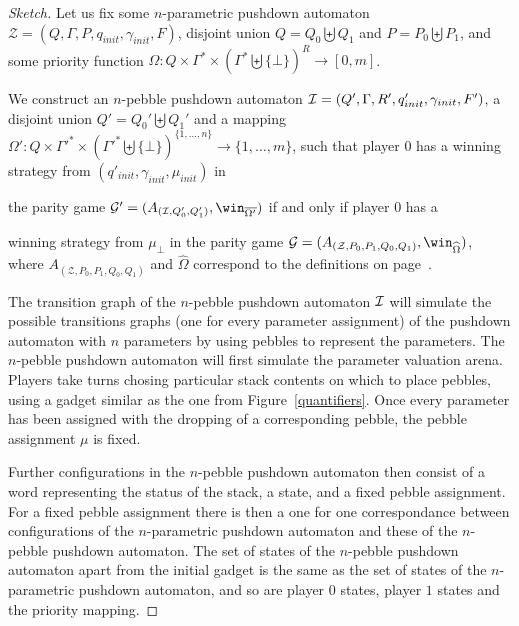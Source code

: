 \begin{proof}[Sketch]


Let us fix some
$n$-parametric pushdown automaton $\mathcal{Z}= (Q, \Gamma, 
P%
, q_{init}, { \gamma_{init}} , F)$,
 disjoint
union $Q = Q_0  \biguplus Q_1$
and $P = P_0 \biguplus P_1$,
and
some priority function 
$\Omega : Q \times \Gamma^* \times ( \Gamma^* \biguplus \{ \bot \})^R \to [0, m ]$.


We construct
  an 
 $n$-pebble pushdown automaton $\mathcal{I} =(Q', \Gamma,  R', q_{init}', {\gamma_{init}} , F')$,
a 
 disjoint
union $Q' = Q_0'  \biguplus Q_1'$
and a mapping $\Omega' : Q \times  \Gamma'^* \times ( \Gamma'^* \biguplus \{ \bot \})^{\{1, \ldots, n\}} \to \{1, \ldots, m \}$,
such that
%
player $0$ has a winning strategy from 
$(q'_{init},\gamma_{init}, \mu_{init})$
in

the parity game
$\mathcal{G'}= (A_{(\ppda, Q'_0, Q'_1)}, \win_{\overline{\Omega'}})$
if and only if
player $0$ has a 

winning strategy from $\mu_\bot$ in 
the parity game
$\mathcal{G} =(A_{(\mathcal{Z}, P_0, P_1, Q_0 , Q_1)}, \win_{\widehat{\Omega}})$,
where		 
$A_{(\mathcal{Z}, P_0, P_1, Q_0 , Q_1)}$
and
$\widehat{\Omega}$
correspond to the definitions on page~\pageref{PPDA reachability game}.

%
%
%
%


The transition graph of the $n$-pebble pushdown automaton $\mathcal{I}$ will simulate the possible transitions graphs 
(one for every 
parameter assignment)
 of the pushdown automaton with $n$ parameters by using pebbles to represent the parameters. 
The $n$-pebble pushdown automaton will first simulate the 
parameter valuation arena.
Players take turns chosing particular stack contents on which to place pebbles,
using a gadget similar as the one from Figure~\ref{quantifiers}. 
Once every parameter has been assigned with the dropping of a corresponding pebble, 
the pebble assignment $\mu$ is fixed.
%
%
%
%
%
%


Further configurations in the $n$-pebble pushdown automaton then consist of a word representing the status of the stack, a state, and a fixed pebble assignment. For a fixed pebble assignment there is then a one for one correspondance between configurations of the $n$-parametric pushdown 
automaton 
and these of the $n$-pebble pushdown automaton. The set of states of the $n$-pebble pushdown automaton apart from the initial gadget is the same as 
the set of states of the $n$-parametric pushdown automaton, and 
so are player $0$ states, player $1$ states and the priority mapping.
\end{proof}




